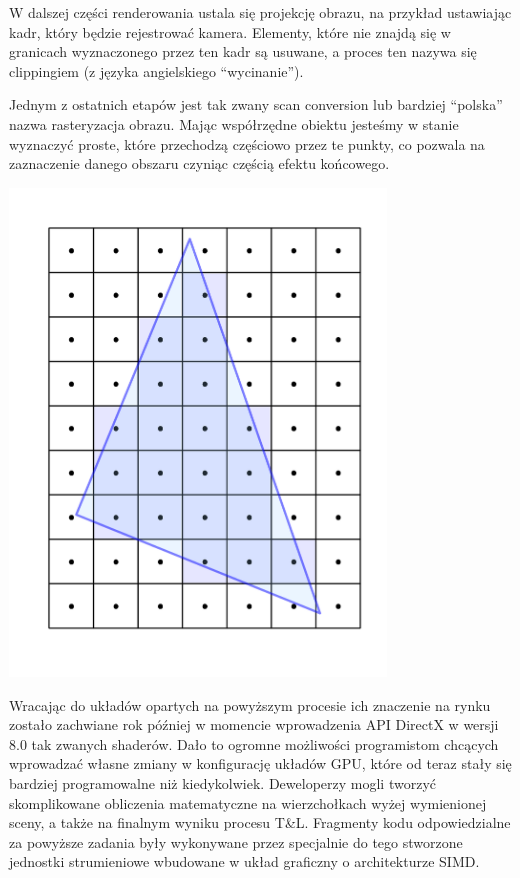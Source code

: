 \documentclass{article}
\begin{document}
\par
W dalszej części renderowania ustala się projekcję obrazu, na przykład ustawiając kadr, który będzie rejestrować kamera. Elementy, które nie znajdą się w granicach wyznaczonego przez ten kadr są usuwane, a proces ten nazywa się clippingiem (z języka angielskiego “wycinanie”).
\par
Jednym z ostatnich etapów jest tak zwany scan conversion lub bardziej “polska” nazwa rasteryzacja obrazu. Mając współrzędne obiektu jesteśmy w stanie wyznaczyć proste, które przechodzą częściowo przez te punkty, co pozwala na zaznaczenie danego obszaru czyniąc częścią efektu końcowego.
\begin{center}
	\includegraphics[width=10cm]{polygon}
\end{center}
\par
Wracając do układów opartych na powyższym procesie ich znaczenie na rynku zostało zachwiane rok później w momencie wprowadzenia API DirectX w wersji 8.0 tak zwanych shaderów. Dało to ogromne możliwości programistom chcących wprowadzać własne zmiany w konfigurację układów GPU, które od teraz stały się bardziej programowalne niż kiedykolwiek. Deweloperzy mogli tworzyć skomplikowane obliczenia matematyczne na wierzchołkach wyżej wymienionej sceny, a także na finalnym wyniku procesu T\&L. Fragmenty kodu odpowiedzialne za powyższe zadania były wykonywane przez specjalnie do tego stworzone jednostki strumieniowe wbudowane w układ graficzny o architekturze SIMD.
\end{document}
